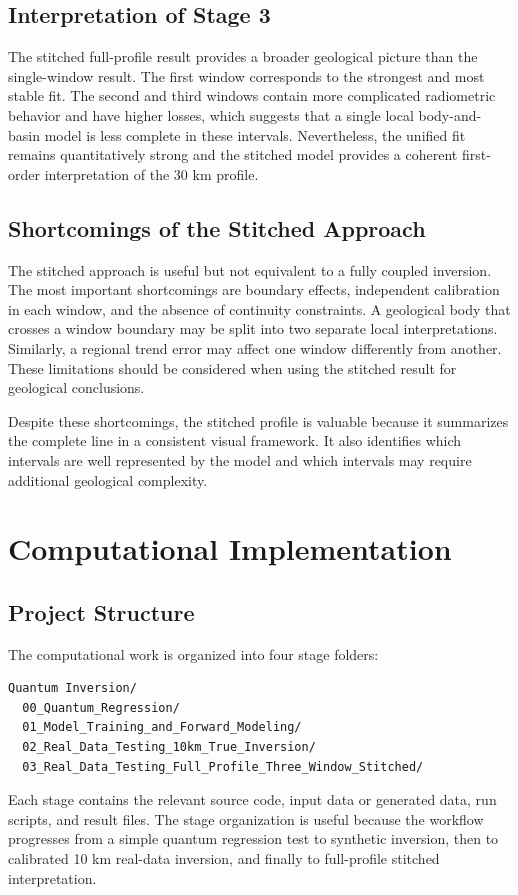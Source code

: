 \documentclass[12pt,a4paper]{article}
\begin{document}
\subsection{Interpretation of Stage 3}
The stitched full-profile result provides a broader geological picture than the single-window result. The first window corresponds to the strongest and most stable fit. The second and third windows contain more complicated radiometric behavior and have higher losses, which suggests that a single local body-and-basin model is less complete in these intervals. Nevertheless, the unified fit remains quantitatively strong and the stitched model provides a coherent first-order interpretation of the 30 km profile.

\subsection{Shortcomings of the Stitched Approach}
The stitched approach is useful but not equivalent to a fully coupled inversion. The most important shortcomings are boundary effects, independent calibration in each window, and the absence of continuity constraints. A geological body that crosses a window boundary may be split into two separate local interpretations. Similarly, a regional trend error may affect one window differently from another. These limitations should be considered when using the stitched result for geological conclusions.

Despite these shortcomings, the stitched profile is valuable because it summarizes the complete line in a consistent visual framework. It also identifies which intervals are well represented by the model and which intervals may require additional geological complexity.

\clearpage
\section{Computational Implementation}
\subsection{Project Structure}
The computational work is organized into four stage folders:
\begin{verbatim}
Quantum Inversion/
  00_Quantum_Regression/
  01_Model_Training_and_Forward_Modeling/
  02_Real_Data_Testing_10km_True_Inversion/
  03_Real_Data_Testing_Full_Profile_Three_Window_Stitched/
\end{verbatim}
Each stage contains the relevant source code, input data or generated data, run scripts, and result files. The stage organization is useful because the workflow progresses from a simple quantum regression test to synthetic inversion, then to calibrated 10 km real-data inversion, and finally to full-profile stitched interpretation.
\end{document}
